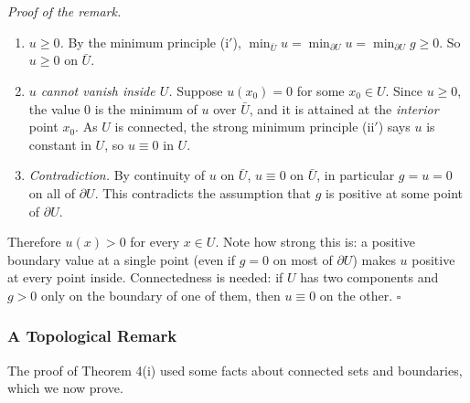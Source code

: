 \documentclass[11pt]{article}
\theoremstyle{plain}
\theoremstyle{definition}
\theoremstyle{remark}
\begin{document}
\emph{Proof of the remark.}
\begin{enumerate}
    \item \emph{$u \geq 0$.} By the minimum principle (i$'$), $\min_{\bar U} u = \min_{\partial U} u = \min_{\partial U} g \geq 0$. So $u \geq 0$ on $\bar U$.
    \item \emph{$u$ cannot vanish inside $U$.} Suppose $u(x_0) = 0$ for some $x_0 \in U$. Since $u \geq 0$, the value $0$ is the minimum of $u$ over $\bar U$, and it is attained at the \emph{interior} point $x_0$. As $U$ is connected, the strong minimum principle (ii$'$) says $u$ is constant in $U$, so $u \equiv 0$ in $U$.
    \item \emph{Contradiction.} By continuity of $u$ on $\bar U$, $u \equiv 0$ on $\bar U$, in particular $g = u = 0$ on all of $\partial U$. This contradicts the assumption that $g$ is positive at some point of $\partial U$.
\end{enumerate}
Therefore $u(x) > 0$ for every $x \in U$. Note how strong this is: a positive boundary value at a single point (even if $g = 0$ on most of $\partial U$) makes $u$ positive at every point inside. Connectedness is needed: if $U$ has two components and $g > 0$ only on the boundary of one of them, then $u \equiv 0$ on the other. $\square$

\subsubsection{A Topological Remark}
The proof of Theorem 4(i) used some facts about connected sets and boundaries, which we now prove.
\end{document}
